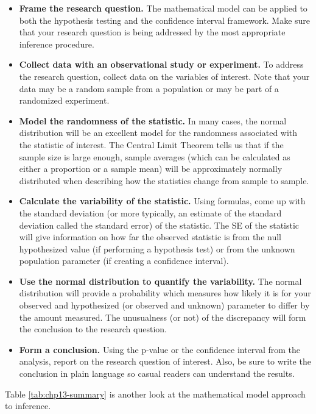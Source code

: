 \documentclass[
  10pt,
  openany]{book}
\providecommand{\tightlist}{%
  \setlength{\itemsep}{0pt}\setlength{\parskip}{0pt}}
\begin{document}
\begin{itemize}
\tightlist
\item
  \textbf{Frame the research question.} The mathematical model can be applied to both the hypothesis testing and the confidence interval framework. Make sure that your research question is being addressed by the most appropriate inference procedure.
\item
  \textbf{Collect data with an observational study or experiment.} To address the research question, collect data on the variables of interest. Note that your data may be a random sample from a population or may be part of a randomized experiment.
\item
  \textbf{Model the randomness of the statistic.} In many cases, the normal distribution will be an excellent model for the randomness associated with the statistic of interest. The Central Limit Theorem tells us that if the sample size is large enough, sample averages (which can be calculated as either a proportion or a sample mean) will be approximately normally distributed when describing how the statistics change from sample to sample.
\item
  \textbf{Calculate the variability of the statistic.} Using formulas, come up with the standard deviation (or more typically, an estimate of the standard deviation called the standard error) of the statistic. The SE of the statistic will give information on how far the observed statistic is from the null hypothesized value (if performing a hypothesis test) or from the unknown population parameter (if creating a confidence interval).
\item
  \textbf{Use the normal distribution to quantify the variability.} The normal distribution will provide a probability which measures how likely it is for your observed and hypothesized (or observed and unknown) parameter to differ by the amount measured. The unusualness (or not) of the discrepancy will form the conclusion to the research question.
\item
  \textbf{Form a conclusion.} Using the p-value or the confidence interval from the analysis, report on the research question of interest. Also, be sure to write the conclusion in plain language so casual readers can understand the results.
\end{itemize}

Table \ref{tab:chp13-summary} is another look at the mathematical model approach to inference.
\end{document}

